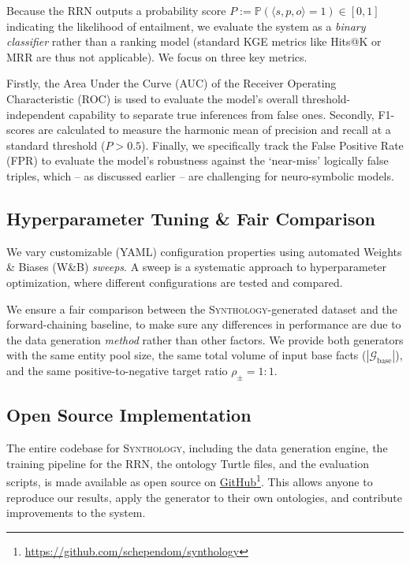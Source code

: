\documentclass{IOS-Book-Article}     %
\renewcommand{\P}{\mathbb{P}}
\newcommand{\gen}[1]{\langle #1 \rangle}
\begin{document}

Because the RRN outputs a probability score $P := \P(\gen{s,p,o} = 1) \in [0, 1]$ indicating the likelihood of entailment, we evaluate the system as a \textit{binary classifier} rather than a ranking model (standard KGE metrics like Hits@K or MRR are thus not applicable). We focus on three key metrics.

Firstly, the Area Under the Curve (AUC) of the Receiver Operating Characteristic (ROC) is used to evaluate the model's overall threshold-independent capability to separate true inferences from false ones. Secondly, F1-scores are calculated to measure the harmonic mean of precision and recall at a standard threshold ($P > 0.5$). Finally, we specifically track the False Positive Rate (FPR) to evaluate the model's robustness against the `near-miss' logically false triples, which -- as discussed earlier -- are challenging for neuro-symbolic models.


\subsection{Hyperparameter Tuning \& Fair Comparison}
We vary customizable (YAML) configuration properties using automated Weights \& Biases (W\&B) \textit{sweeps}. A sweep is a systematic approach to hyperparameter optimization, where different configurations are tested and compared.

We ensure a fair comparison between the \textsc{Synthology}-generated dataset and the forward-chaining baseline, to make sure any differences in performance are due to the data generation \textit{method} rather than other factors. We provide both generators with the same entity pool size, the same total volume of input base facts ($|\mathcal{G}_\text{base}|$), and the same positive-to-negative target ratio $\rho_{\pm} = 1:1$.

\subsection{Open Source Implementation}
The entire codebase for \textsc{Synthology}, including the data generation engine, the training pipeline for the RRN, the ontology Turtle files, and the evaluation scripts, is made available as open source on \href{https://github.com/schependom/synthology}{GitHub}\footnote{\url{https://github.com/schependom/synthology}}. This allows anyone to reproduce our results, apply the generator to their own ontologies, and contribute improvements to the system.
\end{document}
